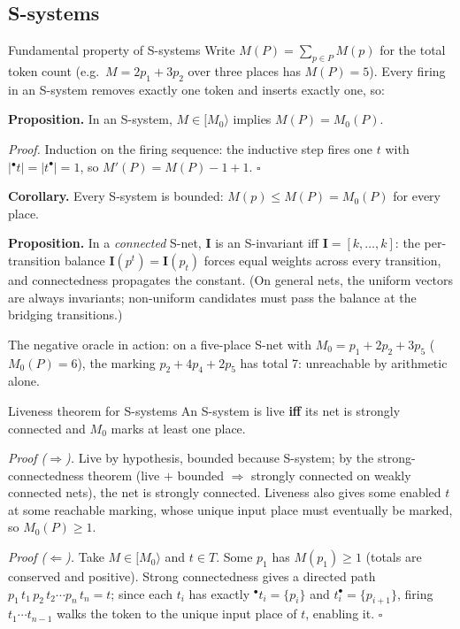 \subsection{S-systems}

\begin{notebox}{Fundamental property of S-systems}
Write $M(P) = \sum_{p \in P} M(p)$ for the total token count (e.g.\ $M = 2p_1 + 3p_2$ over three places has $M(P) = 5$). Every firing in an S-system removes exactly one token and inserts exactly one, so:
\par\smallskip
\textbf{Proposition.} In an S-system, $M \in [M_0\rangle$ implies $M(P) = M_0(P)$.
\par\smallskip
\textit{Proof.} Induction on the firing sequence: the inductive step fires one $t$ with $|{}^\bullet t| = |t^\bullet| = 1$, so $M'(P) = M(P) - 1 + 1$. \hfill$\square$
\par\smallskip
\textbf{Corollary.} Every S-system is bounded: $M(p) \leq M(P) = M_0(P)$ for every place.
\par\smallskip
\textbf{Proposition.} In a \emph{connected} S-net, $\mathbf{I}$ is an S-invariant iff $\mathbf{I} = [k, \ldots, k]$: the per-transition balance $\mathbf{I}(p^t) = \mathbf{I}(p_t)$ forces equal weights across every transition, and connectedness propagates the constant. (On general nets, the uniform vectors are always invariants; non-uniform candidates must pass the balance at the bridging transitions.)
\end{notebox}

The negative oracle in action: on a five-place S-net with $M_0 = p_1 + 2p_2 + 3p_5$ ($M_0(P) = 6$), the marking $p_2 + 4p_4 + 2p_5$ has total 7: unreachable by arithmetic alone.

\begin{notebox}{Liveness theorem for S-systems}
An S-system is live \textbf{iff} its net is strongly connected and $M_0$ marks at least one place.
\par\smallskip
\textit{Proof ($\Rightarrow$).} Live by hypothesis, bounded because S-system; by the strong-connectedness theorem (live $+$ bounded $\Rightarrow$ strongly connected on weakly connected nets), the net is strongly connected. Liveness also gives some enabled $t$ at some reachable marking, whose unique input place must eventually be marked, so $M_0(P) \geq 1$.
\par\smallskip
\textit{Proof ($\Leftarrow$).} Take $M \in [M_0\rangle$ and $t \in T$. Some $p_1$ has $M(p_1) \geq 1$ (totals are conserved and positive). Strong connectedness gives a directed path $p_1\, t_1\, p_2\, t_2 \cdots p_n\, t_n = t$; since each $t_i$ has exactly ${}^\bullet t_i = \{p_i\}$ and $t_i^\bullet = \{p_{i+1}\}$, firing $t_1 \cdots t_{n-1}$ walks the token to the unique input place of $t$, enabling it. \hfill$\square$
\end{notebox}


